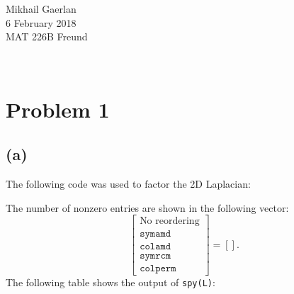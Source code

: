 \documentclass[11pt]{article}
\theoremstyle{definition}
\theoremstyle{remark}
\newcommand{\newquestion}{\hrulefill\vspace{-0.8\baselineskip}\\\null\hrulefill\vspace{-1.0\baselineskip}}
\newcommand{\newpart}{\vspace{-0.5\baselineskip}\hrulefill\vspace{-1.3\baselineskip}}
\theoremstyle{plain}
\begin{document}
  \begin{flushright}
    Mikhail Gaerlan\\
    6 February 2018\\
    MAT 226B Freund
  \end{flushright}
\vspace{-1.3\baselineskip}


\newquestion
%
%
\section*{Problem 1}

\newpart
\subsection*{(a)}
The following code was used to factor the 2D Laplacian:

The number of nonzero entries are shown in the following vector:
\begin{equation*}
  \left[
    \begin{array}{c}
      \textrm{No reordering}\\
      \texttt{symamd}\\
      \texttt{colamd}\\
      \texttt{symrcm}\\
      \texttt{colperm}
    \end{array}
  \right]=
  \left[\right].
\end{equation*}
\newpage
The following table shows the output of \texttt{spy(L)}:
\end{document}
